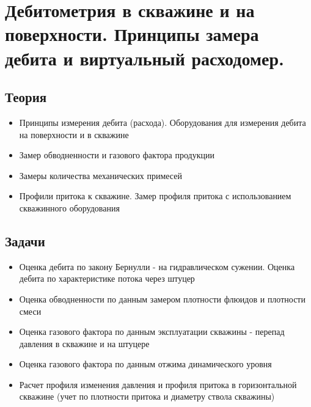 \section{Дебитометрия в скважине и на поверхности. Принципы замера дебита и виртуальный расходомер.}


\subsection{Теория}
\begin{itemize}
    \item Принципы измерения дебита (расхода). Оборудования для измерения дебита на поверхности и в скважине
    \item Замер обводненности и газового фактора продукции
    \item Замеры количества механических примесей
    \item Профили притока к скважине. Замер профиля притока с использованием скважинного оборудования
\end{itemize}

\subsection{Задачи}

\begin{itemize}
    \item Оценка дебита по закону Бернулли - на гидравлическом сужении. Оценка дебита по характеристике потока через штуцер
    \item Оценка обводненности по данным замером плотности флюидов и плотности смеси
    \item Оценка газового фактора по данным эксплуатации скважины - перепад давления в скважине и на штуцере
    \item Оценка газового фактора по данным отжима динамического уровня
    \item Расчет профиля изменения давления и профиля притока в горизонтальной скважине (учет по плотности притока и диаметру ствола скважины)
    
\end{itemize}
    